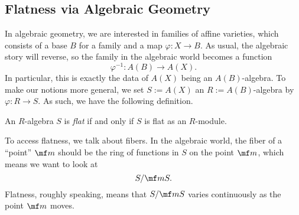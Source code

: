 \subsection{Flatness via Algebraic Geometry}
In algebraic geometry, we are interested in families of affine varieties, which consists of a base $B$ for a family and a map $\varphi:X\to B$. As usual, the algebraic story will reverse, so the family in the algebraic world  becomes a function
\[\varphi^{-1}:A(B)\to A(X).\]
In particular, this is exactly the data of $A(X)$ being an $A(B)$-algebra. To make our notions more general, we set $S:=A(X)$ an $R:=A(B)$-algebra by $\varphi:R\to S$. As such, we have the following definition.
\begin{definition}[Flat]
	An $R$-algebra $S$ is \textit{flat} if and only if $S$ is flat as an $R$-module.
\end{definition}
To access flatness, we talk about fibers. In the algebraic world, the fiber of a ``point'' $\mf m$ should be the ring of functions in $S$ on the point $\mf m$, which means we want to look at
\[S/\mf mS.\]
Flatness, roughly speaking, means that $S/\mf mS$ varies continuously as the point $\mf m$ moves.

